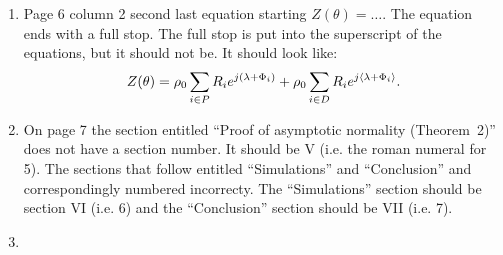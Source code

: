 \documentclass[a4paper,10pt]{article}
\begin{document}
\begin{enumerate}
\item Page 6 column 2 second last equation starting $Z(\theta) = \dots$.  The equation ends with a full stop.  The full stop is put into the superscript of the equations, but it should not be.  It should look like:
\[
Z(\theta) = \rho_0 \sum_{i \in P} R_i e^{j(\lambda + \Phi_i)} + \rho_0  \sum_{i \in D} R_i e^{j\langle \lambda + \Phi_i \rangle}.
\]

\item On page 7 the section entitled ``Proof of asymptotic normality (Theorem~2)'' does not have a section number.  It should be V (i.e. the roman numeral for 5).  The sections that follow entitled ``Simulations'' and ``Conclusion'' and correspondingly numbered incorrecty.  The ``Simulations'' section should be section VI (i.e. 6) and the ``Conclusion'' section should be VII (i.e. 7). 

\item

\end{enumerate}
\end{document}
